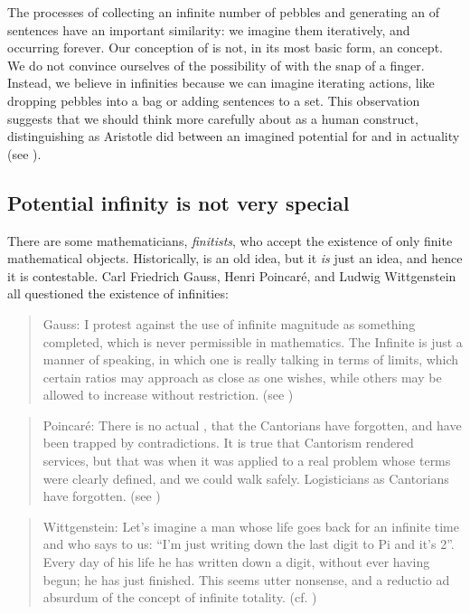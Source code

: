   The processes of collecting an infinite number of pebbles and generating an  of sentences have an important similarity: we imagine them iteratively, and occurring forever. Our conception of  is not, in its most basic form, an  concept. We do not convince ourselves of the possibility of  with the snap of a finger. Instead, we believe in infinities because we can imagine iterating actions, like dropping pebbles into a bag or adding sentences to a set. This observation suggests that we should think more carefully about  as a human construct, distinguishing as Aristotle did between an imagined potential for  and  in actuality (see \citealt{Lear1988}).

\subsection{Potential infinity is not very special}

There are some mathematicians, \textit{finitists}, who accept the existence of only finite mathematical objects. Historically,  is an old idea, but it \textit{is} just an idea, and hence it is contestable. Carl Friedrich Gauss, Henri Poincaré, and Ludwig Wittgenstein all questioned the existence of infinities: 

\begin{quote}
Gauss: I protest against the use of infinite magnitude as something completed, which is never permissible in mathematics. The Infinite is just a manner of speaking, in which one is really talking in terms of limits, which certain ratios may approach as close as one wishes, while others may be allowed to increase without restriction. (see \citealt{Waterhouse1979})
\end{quote}

\begin{quote}
Poincaré: There is no actual , that the Cantorians have forgotten, and have been trapped by contradictions. It is true that Cantorism rendered services, but that was when it was applied to a real problem whose terms were clearly defined, and we could walk safely. Logisticians as Cantorians have forgotten. (see \citealt{PoincaréMaitland2003}) 
\end{quote}

\begin{quote}
Wittgenstein: Let's imagine a man whose life goes back for an infinite time and who says to us: “I'm just writing down the last digit to Pi and it's 2”. Every day of his life he has written down a digit, without ever having begun; he has just finished. This seems utter nonsense, and a reductio ad absurdum of the concept of infinite totality. (cf. \citealt{Wittgenstein1980})
\end{quote}

